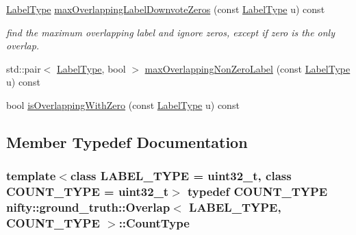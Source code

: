 \begin{DoxyCompactItemize}
\item 
\hyperlink{classnifty_1_1ground__truth_1_1Overlap_af14b9a872d3736d3115231866bc71612}{Label\+Type} \hyperlink{classnifty_1_1ground__truth_1_1Overlap_a6829df43d57809ad890da852e1c0fcdb}{max\+Overlapping\+Label\+Downvote\+Zeros} (const \hyperlink{classnifty_1_1ground__truth_1_1Overlap_af14b9a872d3736d3115231866bc71612}{Label\+Type} u) const 
\begin{DoxyCompactList}\small\item\em find the maximum overlapping label and ignore zeros, except if zero is the only overlap. \end{DoxyCompactList}\item 
std\+::pair$<$ \hyperlink{classnifty_1_1ground__truth_1_1Overlap_af14b9a872d3736d3115231866bc71612}{Label\+Type}, bool $>$ \hyperlink{classnifty_1_1ground__truth_1_1Overlap_ae62c3db2c94307a1a36c16603269cd20}{max\+Overlapping\+Non\+Zero\+Label} (const \hyperlink{classnifty_1_1ground__truth_1_1Overlap_af14b9a872d3736d3115231866bc71612}{Label\+Type} u) const 
\item 
bool \hyperlink{classnifty_1_1ground__truth_1_1Overlap_abb25bb8664462dd27ac19a56fe9b9e9c}{is\+Overlapping\+With\+Zero} (const \hyperlink{classnifty_1_1ground__truth_1_1Overlap_af14b9a872d3736d3115231866bc71612}{Label\+Type} u) const 
\end{DoxyCompactItemize}


\subsection{Member Typedef Documentation}
\hypertarget{classnifty_1_1ground__truth_1_1Overlap_ab8f82b8fef890dc3d7b69da0cc768c76}{}
\subsubsection[{Count\+Type}]{\setlength{\rightskip}{0pt plus 5cm}template$<$class L\+A\+B\+E\+L\+\_\+\+T\+Y\+P\+E  = uint32\+\_\+t, class C\+O\+U\+N\+T\+\_\+\+T\+Y\+P\+E  = uint32\+\_\+t$>$ typedef C\+O\+U\+N\+T\+\_\+\+T\+Y\+P\+E {\bf nifty\+::ground\+\_\+truth\+::\+Overlap}$<$ L\+A\+B\+E\+L\+\_\+\+T\+Y\+P\+E, C\+O\+U\+N\+T\+\_\+\+T\+Y\+P\+E $>$\+::{\bf Count\+Type}}\label{classnifty_1_1ground__truth_1_1Overlap_ab8f82b8fef890dc3d7b69da0cc768c76}
\hypertarget{classnifty_1_1ground__truth_1_1Overlap_af14b9a872d3736d3115231866bc71612}{}
